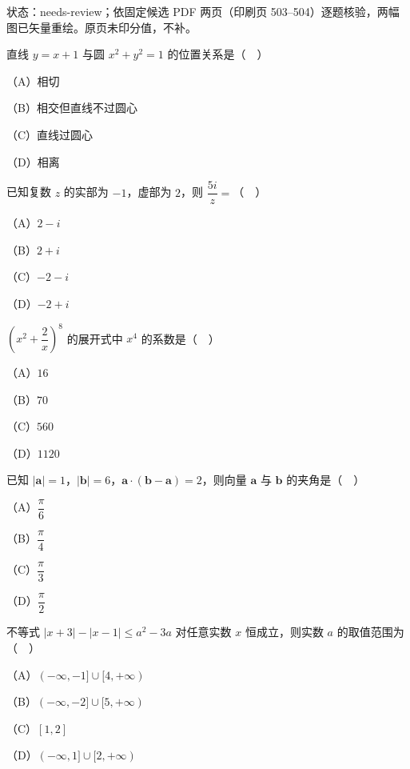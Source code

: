 

状态：needs-review；依固定候选 PDF 两页（印刷页 503–504）逐题核验，两幅图已矢量重绘。原页未印分值，不补。


\begin{question}
直线 $y=x+1$ 与圆 $x^2+y^2=1$ 的位置关系是（　）

（A）相切

（B）相交但直线不过圆心

（C）直线过圆心

（D）相离

\end{question}
\begin{question}
已知复数 $z$ 的实部为 $-1$，虚部为 $2$，则 $\dfrac{5i}{z}=$（　）

（A）$2-i$

（B）$2+i$

（C）$-2-i$

（D）$-2+i$

\end{question}
\begin{question}
$\left(x^2+\dfrac2x\right)^8$ 的展开式中 $x^4$ 的系数是（　）

（A）$16$

（B）$70$

（C）$560$

（D）$1120$

\end{question}
\begin{question}
已知 $|\boldsymbol a|=1$，$|\boldsymbol b|=6$，$\boldsymbol a\cdot(\boldsymbol b-\boldsymbol a)=2$，则向量 $\boldsymbol a$ 与 $\boldsymbol b$ 的夹角是（　）

（A）$\dfrac\pi6$

（B）$\dfrac\pi4$

（C）$\dfrac\pi3$

（D）$\dfrac\pi2$

\end{question}
\begin{question}
不等式 $|x+3|-|x-1|\leqslant a^2-3a$ 对任意实数 $x$ 恒成立，则实数 $a$ 的取值范围为（　）

（A）$(-\infty,-1]\cup[4,+\infty)$

（B）$(-\infty,-2]\cup[5,+\infty)$

（C）$[1,2]$

（D）$(-\infty,1]\cup[2,+\infty)$

\end{question}

